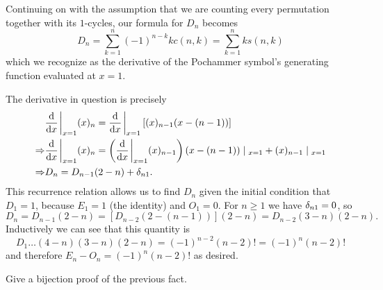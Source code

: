 \documentclass[12pt]{memoir}
\begin{document}
\begin{ptcb}
    Continuing on with the assumption that we are counting every permutation together with its $1$-cycles, our formula for $D_n$ becomes 
    $$D_n=\sum_{k=1}^n(-1)^{n-k}kc(n,k)=\sum_{k=1}^nks(n,k)$$
    which we recognize as the derivative of the Pochammer symbol's generating function evaluated at $x=1$.\par 
    The derivative in question is precisely
    \begin{align*}
        &\dv{x}\eval_{x=1}(x)_n=\dv{x}\eval_{x=1}\left\lbrack(x)_{n-1}(x-(n-1))\right\rbrack\\
        \To&\dv{x}\eval_{x=1}(x)_n=\left(\dv{x}\eval_{x=1}(x)_{n-1}\right)(x-(n-1))\mid_{x=1}+(x)_{n-1}\mid_{x=1}\\
        \To&D_n=D_{n-1}(2-n)+\dl_{n1}.
    \end{align*}
    This recurrence relation allows us to find $D_n$ given the initial condition that $D_1=1$, because $E_1=1$ (the identity) and $O_1=0$. For $n\geq 1$ we have $\delta_{n1}=0$, so 
    $$D_n=D_{n-1}(2-n)=[D_{n-2}(2-(n-1))](2-n)=D_{n-2}(3-n)(2-n).$$
    Inductively we can see that this quantity is 
    $$D_1\dots(4-n)(3-n)(2-n)=(-1)^{n-2}(n-2)!=(-1)^n(n-2)!$$
    and therefore $E_n-O_n=(-1)^n(n-2)!$ as desired.
\end{ptcb}

\begin{Ej}
    Give a bijection proof of the previous fact.
\end{Ej}
\end{document}
